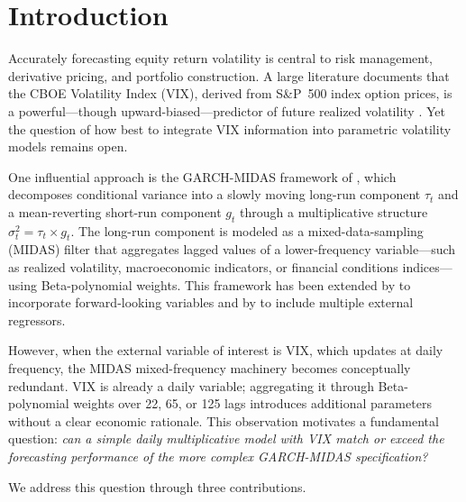 \documentclass[12pt,a4paper]{article}
\begin{document}
\newpage
\tableofcontents
\newpage

\section{Introduction}
\label{sec:intro}

Accurately forecasting equity return volatility is central to risk management, derivative pricing, and portfolio construction. A large literature documents that the CBOE Volatility Index (VIX), derived from S\&P~500 index option prices, is a powerful---though upward-biased---predictor of future realized volatility \citep{christensen1998, jiang2005, bekaert2014}. Yet the question of how best to integrate VIX information into parametric volatility models remains open.

One influential approach is the GARCH-MIDAS framework of \citet{engle2013}, which decomposes conditional variance into a slowly moving long-run component $\tau_t$ and a mean-reverting short-run component $g_t$ through a multiplicative structure $\sigma_t^2 = \tau_t \times g_t$. The long-run component is modeled as a mixed-data-sampling (MIDAS) filter that aggregates lagged values of a lower-frequency variable---such as realized volatility, macroeconomic indicators, or financial conditions indices---using Beta-polynomial weights. This framework has been extended by \citet{conrad2015} to incorporate forward-looking variables and by \citet{conrad2020} to include multiple external regressors.

However, when the external variable of interest is VIX, which updates at daily frequency, the MIDAS mixed-frequency machinery becomes conceptually redundant. VIX is already a daily variable; aggregating it through Beta-polynomial weights over 22, 65, or 125 lags introduces additional parameters without a clear economic rationale. This observation motivates a fundamental question: \emph{can a simple daily multiplicative model with VIX match or exceed the forecasting performance of the more complex GARCH-MIDAS specification?}

We address this question through three contributions.
\end{document}
